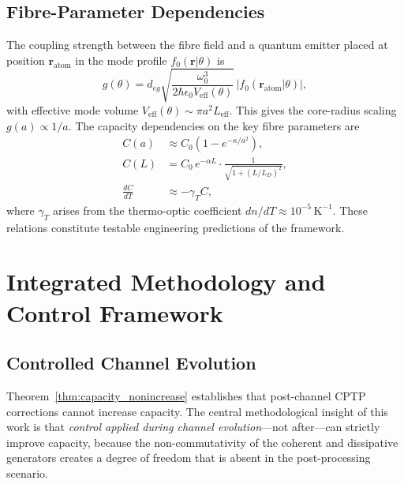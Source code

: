 \documentclass[journal,twocolumn]{IEEEtran}
\theoremstyle{definition}
\theoremstyle{plain}
\begin{document}
\subsection{Fibre-Parameter Dependencies}

The coupling strength between the fibre field and a quantum emitter
placed at position $\mathbf{r}_{\mathrm{atom}}$ in the mode profile
$f_0(\mathbf{r}|\theta)$ is
\begin{equation}
  g(\theta) = d_{eg}\sqrt{\frac{\omega_0^3}
    {2\hbar\epsilon_0 V_{\mathrm{eff}}(\theta)}}\,
  \bigl|f_0(\mathbf{r}_{\mathrm{atom}}|\theta)\bigr|,
  \label{eq:coupling}
\end{equation}
with effective mode volume $V_{\mathrm{eff}}(\theta) \sim \pi
a^2 L_{\mathrm{eff}}$.  This gives the core-radius scaling
$g(a) \propto 1/a$.  The capacity dependencies on the key fibre
parameters are
\begin{align}
  C(a) &\approx C_0\!\left(1 - e^{-\kappa/a^2}\right), \label{eq:Ca}\\
  C(L) &= C_0\, e^{-\alpha L} \cdot
    \frac{1}{\sqrt{1+(L/L_D)^2}}, \label{eq:CL}\\
  \frac{dC}{dT} &\approx -\gamma_T C, \label{eq:CT}
\end{align}
where $\gamma_T$ arises from the thermo-optic coefficient
$dn/dT \approx 10^{-5}\,\mathrm{K}^{-1}$.  These relations
constitute testable engineering predictions of the framework.

\section{Integrated Methodology and Control Framework}
\label{sec:methodology}

\subsection{Controlled Channel Evolution}

Theorem~\ref{thm:capacity_nonincrease} establishes that
post-channel CPTP corrections cannot increase capacity.  The central
methodological insight of this work is that \emph{control applied
during channel evolution}---not after---can strictly improve
capacity, because the non-commutativity of the coherent and
dissipative generators creates a degree of freedom that is absent in
the post-processing scenario.
\end{document}
